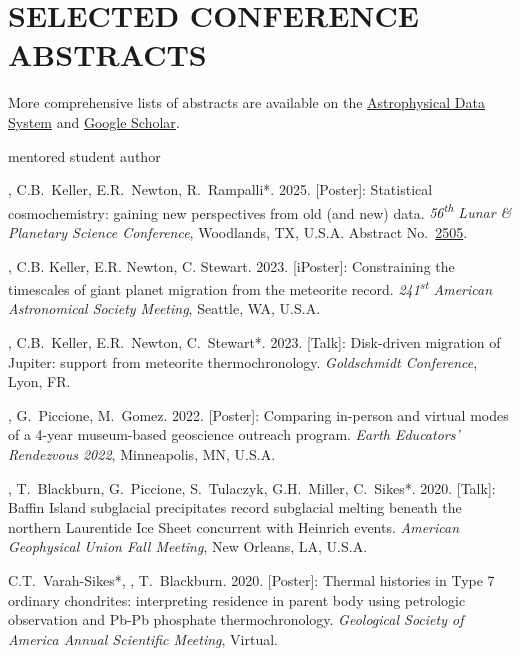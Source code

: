 \section{SELECTED CONFERENCE ABSTRACTS}

More comprehensive lists of abstracts are available on the \href{https://ui.adsabs.harvard.edu/search/q=author%3A%22Edwards%2C%20Graham%20Harper%22}{Astrophysical Data System} and \href{https://scholar.google.com/citations?user=KHLOvgcAAAAJ&hl=en}{Google Scholar}.

\hfill* mentored student author

\begin{etaremune} [itemsep=4pt, leftmargin=3ex]
  
 \item \ghedwards, C.B.~Keller, E.R.~Newton, R.~Rampalli*. 2025. [Poster]: Statistical cosmochemistry: gaining new perspectives from old (and new) data. \textit{56\textsuperscript{th} Lunar \& Planetary Science Conference}, Woodlands, TX, U.S.A. Abstract No.~\href{https://www.hou.usra.edu/meetings/lpsc2025/pdf/2505.pdf}{2505}.
 
 \item \ghedwards, C.B. Keller,  E.R. Newton, C. Stewart. 2023. [iPoster]: Constraining the timescales of giant planet migration from the meteorite record. \textit{241\textsuperscript{st} American Astronomical Society Meeting}, Seattle, WA, U.S.A.

  \item \ghedwards, C.B.~Keller, E.R.~Newton, C.~Stewart*. 2023. [Talk]: Disk-driven migration of Jupiter: support from meteorite thermochronology. \textit{Goldschmidt Conference}, Lyon, FR. 
  
  \item \ghedwards, G.~Piccione, M.~Gomez. 2022. [Poster]: Comparing in-person and virtual modes of a 4-year museum-based geoscience outreach program. \textit{Earth Educators' Rendezvous 2022}, Minneapolis, MN, U.S.A.
  
  \item \ghedwards, T.~Blackburn, G.~Piccione, S.~Tulaczyk, G.H.~Miller, C.~Sikes*. 2020. [Talk]: Baffin Island subglacial precipitates record subglacial melting beneath the northern Laurentide Ice Sheet concurrent with Heinrich events. \textit{American Geophysical Union Fall Meeting}, New Orleans, LA, U.S.A.
  
  \item C.T.~Varah-Sikes*, \ghedwards, T.~Blackburn. 2020. [Poster]: Thermal histories in Type 7 ordinary chondrites: interpreting residence in parent body using petrologic observation and Pb-Pb phosphate thermochronology. \textit{Geological Society of America Annual Scientific Meeting}, Virtual.
  

\end{etaremune}
